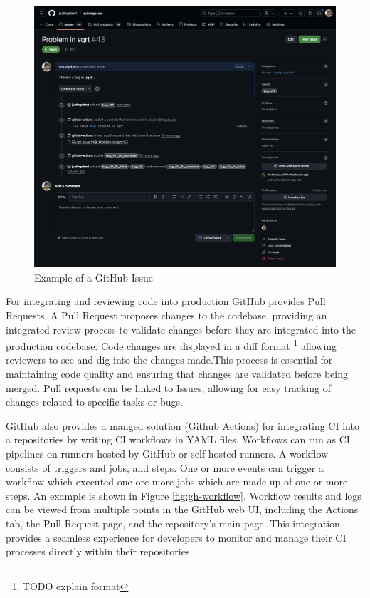 \begin{figure}[H]
    \centering
    \includegraphics[width=1\textwidth]{images/github/github_issue.png}
    \caption{Example of a GitHub Issue}
    \label{fig:gh-issue}
\end{figure}

For integrating and reviewing code into production GitHub provides Pull Requests. A Pull Request proposes changes to the codebase, providing an integrated review process to validate changes before they are integrated into the production codebase. Code changes are displayed in a diff format \footnote{TODO explain format} allowing reviewers to see and dig into the changes made.This process is essential for maintaining code quality and ensuring that changes are validated before being merged. %
Pull requests can be linked to Issues, allowing for easy tracking of changes related to specific tasks or bugs. %

GitHub also provides a manged solution (Github Actions) for integrating CI into a repositories by writing CI workflows in YAML files. Workflows can run as CI pipelines on runners hosted by GitHub or self hosted runners. A workflow consists of triggers and jobs, and steps. One or more events can trigger a workflow which executed one ore more jobs which are made up of one or more steps. \cite{Workflows} An example is shown in Figure \ref{fig:gh-workflow}. Workflow results and logs can be viewed from multiple points in the GitHub web UI, including the Actions tab, the Pull Request page, and the repository's main page. This integration provides a seamless experience for developers to monitor and manage their CI processes directly within their repositories.

